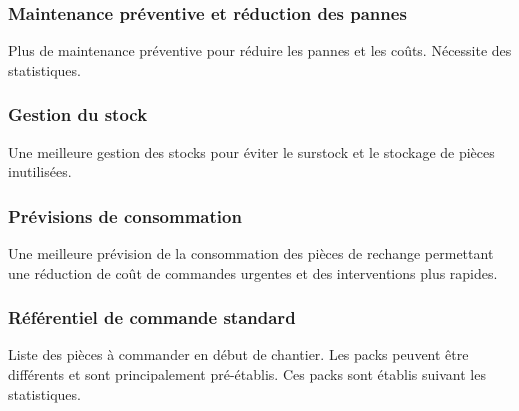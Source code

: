 \subsubsection{Maintenance préventive et réduction des pannes}

Plus de maintenance préventive pour réduire les pannes et les coûts. Nécessite des statistiques.

\subsubsection{Gestion du stock}
	Une meilleure gestion des stocks pour éviter le surstock et le stockage de pièces inutilisées.

\subsubsection{Prévisions de consommation}
	Une meilleure prévision de la consommation des pièces de rechange permettant une réduction de coût de commandes urgentes et des interventions plus rapides.

\subsubsection{Référentiel de commande standard}
	Liste des pièces à commander en début de chantier. Les packs peuvent être différents et sont principalement pré-établis. Ces packs sont établis suivant les statistiques.
